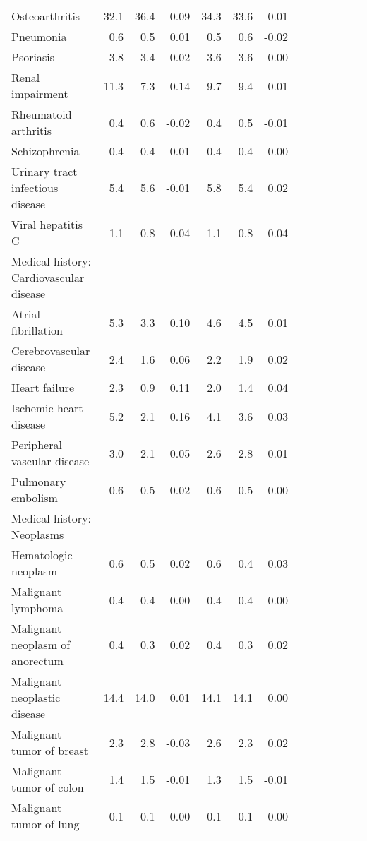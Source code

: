 \documentclass[11pt,]{article}
\begin{document}
\begin{longtable}{lrrrrrrrrrrrr}
      Osteoarthritis & 32.1 & 36.4 & -0.09 & 34.3 & 33.6 &  0.01 \\ 
      Pneumonia &  0.6 &  0.5 &  0.01 &  0.5 &  0.6 & -0.02 \\ 
      Psoriasis &  3.8 &  3.4 &  0.02 &  3.6 &  3.6 &  0.00 \\ 
      Renal impairment & 11.3 &  7.3 &  0.14 &  9.7 &  9.4 &  0.01 \\ 
      Rheumatoid arthritis &  0.4 &  0.6 & -0.02 &  0.4 &  0.5 & -0.01 \\ 
      Schizophrenia &  0.4 &  0.4 &  0.01 &  0.4 &  0.4 &  0.00 \\ 
      Urinary tract infectious disease &  5.4 &  5.6 & -0.01 &  5.8 &  5.4 &  0.02 \\ 
      Viral hepatitis C &  1.1 &  0.8 &  0.04 &  1.1 &  0.8 &  0.04 \\ 
  Medical history: Cardiovascular disease &    &    &     &    &    &     \\ 
      Atrial fibrillation &  5.3 &  3.3 &  0.10 &  4.6 &  4.5 &  0.01 \\ 
      Cerebrovascular disease &  2.4 &  1.6 &  0.06 &  2.2 &  1.9 &  0.02 \\ 
      Heart failure &  2.3 &  0.9 &  0.11 &  2.0 &  1.4 &  0.04 \\ 
      Ischemic heart disease &  5.2 &  2.1 &  0.16 &  4.1 &  3.6 &  0.03 \\ 
      Peripheral vascular disease &  3.0 &  2.1 &  0.05 &  2.6 &  2.8 & -0.01 \\ 
      Pulmonary embolism &  0.6 &  0.5 &  0.02 &  0.6 &  0.5 &  0.00 \\ 
  Medical history: Neoplasms &    &    &     &    &    &     \\ 
      Hematologic neoplasm &  0.6 &  0.5 &  0.02 &  0.6 &  0.4 &  0.03 \\ 
      Malignant lymphoma &  0.4 &  0.4 &  0.00 &  0.4 &  0.4 &  0.00 \\ 
      Malignant neoplasm of anorectum &  0.4 &  0.3 &  0.02 &  0.4 &  0.3 &  0.02 \\ 
      Malignant neoplastic disease & 14.4 & 14.0 &  0.01 & 14.1 & 14.1 &  0.00 \\ 
      Malignant tumor of breast &  2.3 &  2.8 & -0.03 &  2.6 &  2.3 &  0.02 \\ 
      Malignant tumor of colon &  1.4 &  1.5 & -0.01 &  1.3 &  1.5 & -0.01 \\ 
      Malignant tumor of lung &  0.1 &  0.1 &  0.00 &  0.1 &  0.1 &  0.00 \\ 

\end{longtable}
\end{document}
